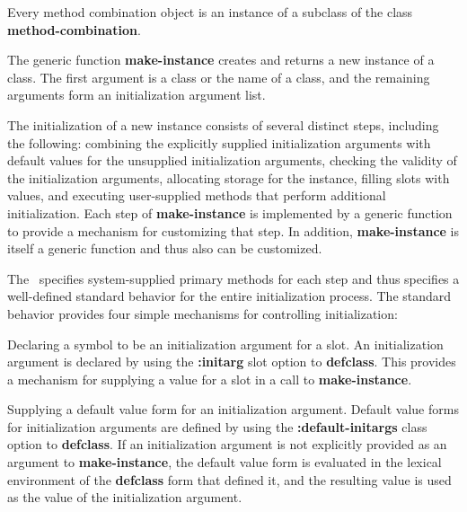 \item{\bull} Every method combination object is an instance of a
subclass of the class {\bf method-combination}.

\endlist

\endsubSection%

\endSection%


The generic function {\bf make-instance} creates and returns a new
instance of a class.  The first argument is a class or the name of a
class, and the remaining arguments form an {\bit initialization argument\/}
list.  

The initialization of a new instance consists of several distinct
steps, including the following: combining the explicitly supplied
initialization arguments with default values for the unsupplied
initialization arguments, checking the validity of the initialization
arguments, allocating storage for the instance, filling slots with
values, and executing user-supplied methods that perform additional
initialization.  Each step of {\bf make-instance} is implemented by a
generic function to provide a mechanism for customizing that step.  In
addition, {\bf make-instance} is itself a generic function and thus
also can be customized.

The \OS\ specifies system-supplied primary methods for each step and
thus specifies a well-defined standard behavior for the entire
initialization process.  The standard behavior provides four simple
mechanisms for controlling initialization:

\beginlist

\item{\bull} Declaring a symbol to be an initialization argument for a
slot.  An initialization argument is declared by using the {\bf
:initarg} slot option to {\bf defclass}.  This provides a mechanism
for supplying a value for a slot in a call to {\bf make-instance}.

\item{\bull} Supplying a default value form for an initialization
argument.  Default value forms for initialization arguments are
defined by using the {\bf :default-initargs} class option to {\bf
defclass}.  If an initialization argument is not explicitly provided
as an argument to {\bf make-instance}, the default value form is
evaluated in the lexical environment of the {\bf defclass} form that
defined it, and the resulting value is used as the value of the
initialization argument.

